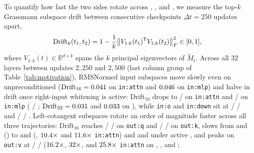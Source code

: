 To quantify how fast the two sides rotate across , ,
and , we measure the top-$k$ Grassmann subspace drift between
consecutive checkpoints $\Delta t = 250$ updates apart,
\begin{equation}
\label{eq:grassmann}
\mathrm{Drift}_k(t_1, t_2)
= 1 - \frac{1}{k}\bigl\|V_{1:k}(t_1)^{{\mathsf T}} V_{1:k}(t_2)\bigr\|_F^2 \in [0, 1],
\end{equation}
where $V_{1:k}(t)\in\mathbb R^{d\times k}$ spans the $k$ principal eigenvectors
of $\tilde M_t$. Across all $32$ layers between updates $2{,}250$ and $2{,}500$
(last column group of Table~\ref{tab:motivation}), RMSNormed input subspaces
move slowly even on unpreconditioned  ($\mathrm{Drift}_{16} =
0.041{}$ on \texttt{in:attn} and
$0.046{}$ on \texttt{in:mlp}) and halve in drift
once right-input whitening is active: $\mathrm{Drift}_{16}$ drops to
\motInAttnDriftTopSixteenMean{} / \motWtInAttnDriftTopSixteenMean{} on
\texttt{in:attn} and \motInMlpDriftTopSixteenMean{} /
\motWtInMlpDriftTopSixteenMean{} on \texttt{in:mlp} ( /
; $\mathrm{Drift}_{32} = 0.031{}$ and
$0.033{}$ on ), while \texttt{in:o} and
\texttt{in:down} sit at \motMuonInODriftTopSixteenMean{} /
\motInODriftTopSixteenMean{} / \motWtInODriftTopSixteenMean{} and
\motMuonInDownDriftTopSixteenMean{} / \motInDownDriftTopSixteenMean{} /
\motWtInDownDriftTopSixteenMean{}. Left-cotangent subspaces rotate an order of
magnitude faster across all three trajectories: $\mathrm{Drift}_{16}$ reaches
\motMuonOutQDriftTopSixteenMean{} / \motOutQDriftTopSixteenMean{} /
\motWtOutQDriftTopSixteenMean{} on \texttt{out:q} and
\motMuonOutKDriftTopSixteenMean{} / \motOutKDriftTopSixteenMean{} /
\motWtOutKDriftTopSixteenMean{} on \texttt{out:k}, slows from
\motMuonOutUpDriftTopSixteenMean{} and \motMuonOutGateDriftTopSixteenMean{}
() to \motOutUpDriftTopSixteenMean{} and
\motOutGateDriftTopSixteenMean{} (, $10.4\times$
and $11.6\times$ \texttt{in:attn}) and
\motWtOutUpDriftTopSixteenMean{} and \motWtOutGateDriftTopSixteenMean{} under
active , and peaks on \texttt{out:v} at
\motMuonOutVDriftTopSixteenMean{} / \motOutVDriftTopSixteenMean{} /
\motWtOutVDriftTopSixteenMean{} ($16.2\times$,
$32\times$, and $25.8\times$
\texttt{in:attn} on , , and ;
